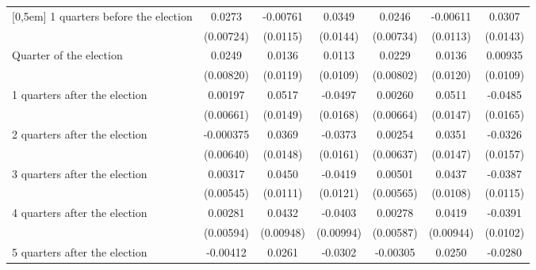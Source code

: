 \begin{table}[!ht]
\begin{tabular}{l*{6}{c}}
[0,5em]
 1 quarters before the election&      0.0273\sym{***}&    -0.00761         &      0.0349\sym{*}  &      0.0246\sym{***}&    -0.00611         &      0.0307\sym{*}  \\
                    &   (0.00724)         &    (0.0115)         &    (0.0144)         &   (0.00734)         &    (0.0113)         &    (0.0143)         \\
[0,5em]
Quarter of the election&      0.0249\sym{**} &      0.0136         &      0.0113         &      0.0229\sym{**} &      0.0136         &     0.00935         \\
                    &   (0.00820)         &    (0.0119)         &    (0.0109)         &   (0.00802)         &    (0.0120)         &    (0.0109)         \\
[0,5em]
 1 quarters after the election&     0.00197         &      0.0517\sym{***}&     -0.0497\sym{**} &     0.00260         &      0.0511\sym{***}&     -0.0485\sym{**} \\
                    &   (0.00661)         &    (0.0149)         &    (0.0168)         &   (0.00664)         &    (0.0147)         &    (0.0165)         \\
[0,5em]
 2 quarters after the election&   -0.000375         &      0.0369\sym{*}  &     -0.0373\sym{*}  &     0.00254         &      0.0351\sym{*}  &     -0.0326\sym{*}  \\
                    &   (0.00640)         &    (0.0148)         &    (0.0161)         &   (0.00637)         &    (0.0147)         &    (0.0157)         \\
[0,5em]
 3 quarters after the election&     0.00317         &      0.0450\sym{***}&     -0.0419\sym{***}&     0.00501         &      0.0437\sym{***}&     -0.0387\sym{***}\\
                    &   (0.00545)         &    (0.0111)         &    (0.0121)         &   (0.00565)         &    (0.0108)         &    (0.0115)         \\
[0,5em]
 4 quarters after the election&     0.00281         &      0.0432\sym{***}&     -0.0403\sym{***}&     0.00278         &      0.0419\sym{***}&     -0.0391\sym{***}\\
                    &   (0.00594)         &   (0.00948)         &   (0.00994)         &   (0.00587)         &   (0.00944)         &    (0.0102)         \\
[0,5em]
 5 quarters after the election&    -0.00412         &      0.0261\sym{*}  &     -0.0302\sym{**} &    -0.00305         &      0.0250\sym{*}  &     -0.0280\sym{**} \\

\end{tabular}
\end{table}
